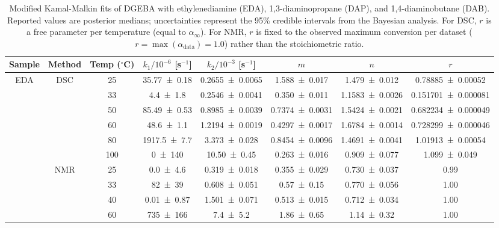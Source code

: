 \begin{table}[!ht]
\caption{Modified Kamal-Malkin fits of DGEBA with ethylenediamine (EDA), 1,3-diaminopropane (DAP), and 1,4-diaminobutane (DAB). Reported values are posterior medians; uncertainties represent the 95\% credible intervals from the Bayesian analysis. For DSC, $r$ is a free parameter per temperature (equal to $\alpha_\infty$). For NMR, $r$ is fixed to the observed maximum conversion per dataset ($r = \max(\alpha_\mathrm{data}) =1.0$) rather than the stoichiometric ratio.}
\label{tab:KM_with_r}
    \centering
    \begin{tabular}{c|cc ccccc}
        Sample & Method & Temp ($^\circ$C) & $k_1/10^{-6}$ [s$^{-1}$] & $k_2/10^{-3}$ [s$^{-1}$] & $m$ & $n$ & $r$ \\ \midrule
        \multirow{10}{*}{EDA} & \multirow{6}{*}{DSC} & 25 & \num{35.77 \pm 0.18} & \num{0.2655 \pm 0.0065} & \num{1.588 \pm 0.017} & \num{1.479 \pm 0.012} & \num{0.78885 \pm 0.00052} \\
        ~ & ~ & 33 & \num{4.4 \pm 1.8} & \num{0.2546 \pm 0.0041} & \num{0.350 \pm 0.011} & \num{1.1583 \pm 0.0026} & \num{0.151701 \pm 0.000081} \\
        ~ & ~ & 50 & \num{85.49 \pm 0.53} & \num{0.8985 \pm 0.0039} & \num{0.7374 \pm 0.0031} & \num{1.5424 \pm 0.0021} & \num{0.682234 \pm 0.000049} \\
        ~ & ~ & 60 & \num{48.6 \pm 1.1} & \num{1.2194 \pm 0.0019} & \num{0.4297 \pm 0.0017} & \num{1.6784 \pm 0.0014} & \num{0.728299 \pm 0.000046} \\
        ~ & ~ & 80 & \num{1917.5 \pm 7.7} & \num{3.373 \pm 0.028} & \num{0.8454 \pm 0.0096} & \num{1.4691 \pm 0.0041} & \num{1.01913 \pm 0.00054} \\
        ~ & ~ & 100 & \num{0 \pm 140} & \num{10.50 \pm 0.45} & \num{0.263 \pm 0.016} & \num{0.909 \pm 0.077} & \num{1.099 \pm 0.049} \\
        \cline{2-8}
        ~ & \multirow{4}{*}{NMR} & 25 & \num{0.0 \pm 4.6} & \num{0.319 \pm 0.018} & \num{0.355 \pm 0.029} & \num{0.730 \pm 0.037} & 0.99 \\
        ~ & ~ & 33 & \num{82 \pm 39} & \num{0.608 \pm 0.051} & \num{0.57 \pm 0.15} & \num{0.770 \pm 0.056} & 1.00 \\
        ~ & ~ & 40 & \num{0.01 \pm 0.87} & \num{1.501 \pm 0.071} & \num{0.513 \pm 0.015} & \num{0.712 \pm 0.034} & 1.00 \\
        ~ & ~ & 60 & \num{735 \pm 166} & \num{7.4 \pm 5.2} & \num{1.86 \pm 0.65} & \num{1.14 \pm 0.32} & 1.00 \\

\end{tabular}
\end{table}
